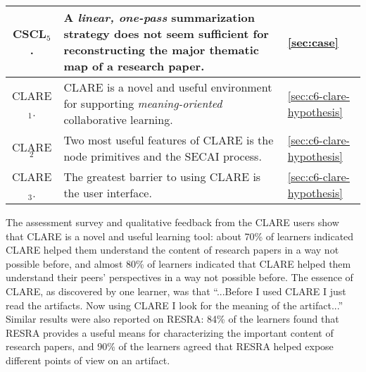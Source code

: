 \begin{table}[hbtp]
\begin{center}
\begin{tabular} {||c|p{4.0in}|p{0.5in}||}
   {\sf CSCL\(_5\).} & A {\it linear, one-pass\/} summarization strategy
   does not seem sufficient for reconstructing the major thematic
   map of a research paper. & \ref{sec:case} \\ \hline \hline
   
   {\sf CLARE\(_1\).} & CLARE is a novel and useful environment for
   supporting {\it meaning-oriented \/}collaborative learning. &
   \ref{sec:c6-clare-hypothesis} \\ \hline
   
   {\sf CLARE\(_2\)} & Two most useful features of CLARE is the node
   primitives and the SECAI process. & \ref{sec:c6-clare-hypothesis}
   \\ \hline
    
   {\sf CLARE\(_3\).} & The greatest barrier to using CLARE is the user
   interface. & \ref{sec:c6-clare-hypothesis} \\ \hline
  \end{tabular}
  \end{center}
   \label{tab:result-summary}
\end{table}
\normalsize
{}

The assessment survey and qualitative feedback from the CLARE users show
that CLARE is a novel and useful learning tool: about 70\% of learners
indicated CLARE helped them understand the content of research papers in a
way not possible before, and almost 80\% of learners indicated that CLARE
helped them understand their peers' perspectives in a way not possible
before. The essence of CLARE, as discovered by one learner, was that
``...Before I used CLARE I just read the artifacts.  Now using CLARE I look
for the meaning of the artifact...''  Similar results were also reported on
RESRA: 84\% of the learners found that RESRA provides a useful means for
characterizing the important content of research papers, and 90\% of the
learners agreed that RESRA helped expose different points of view on an
artifact.

